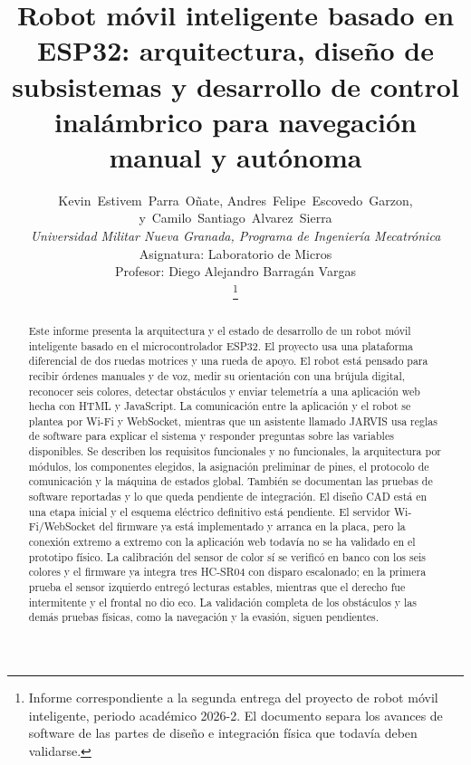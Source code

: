 \documentclass[journal]{IEEEtran}
\begin{document}

\title{Robot móvil inteligente basado en ESP32: arquitectura, diseño de subsistemas y desarrollo de control inalámbrico para navegación manual y autónoma}


\author{
Kevin~Estivem~Parra~Oñate,
Andres~Felipe~Escovedo~Garzon,
y~Camilo~Santiago~Alvarez~Sierra\\
\textit{Universidad Militar Nueva Granada, Programa de Ingeniería Mecatrónica}\\
Asignatura: Laboratorio de Micros\\
Profesor: Diego Alejandro Barragán Vargas\\
\thanks{Informe correspondiente a la segunda entrega del proyecto de robot móvil inteligente, periodo académico 2026-2. El documento separa los avances de software de las partes de diseño e integración física que todavía deben validarse.}
}

\maketitle


\begin{abstract}
Este informe presenta la arquitectura y el estado de desarrollo de un robot móvil inteligente basado en el microcontrolador ESP32. El proyecto usa una plataforma diferencial de dos ruedas motrices y una rueda de apoyo. El robot está pensado para recibir órdenes manuales y de voz, medir su orientación con una brújula digital, reconocer seis colores, detectar obstáculos y enviar telemetría a una aplicación web hecha con HTML y JavaScript. La comunicación entre la aplicación y el robot se plantea por Wi-Fi y WebSocket, mientras que un asistente llamado JARVIS usa reglas de software para explicar el sistema y responder preguntas sobre las variables disponibles. Se describen los requisitos funcionales y no funcionales, la arquitectura por módulos, los componentes elegidos, la asignación preliminar de pines, el protocolo de comunicación y la máquina de estados global. También se documentan las pruebas de software reportadas y lo que queda pendiente de integración. El diseño CAD está en una etapa inicial y el esquema eléctrico definitivo está pendiente. El servidor Wi-Fi/WebSocket del firmware ya está implementado y arranca en la placa, pero la conexión extremo a extremo con la aplicación web todavía no se ha validado en el prototipo físico. La calibración del sensor de color sí se verificó en banco con los seis colores y el firmware ya integra tres HC-SR04 con disparo escalonado; en la primera prueba el sensor izquierdo entregó lecturas estables, mientras que el derecho fue intermitente y el frontal no dio eco. La validación completa de los obstáculos y las demás pruebas físicas, como la navegación y la evasión, siguen pendientes.
\end{abstract}
\end{document}
